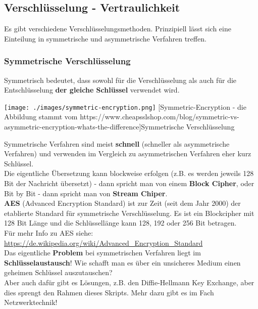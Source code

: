 \documentclass[10pt,a4paper,titlepage]{article}
\begin{document}
\subsection{Verschlüsselung - Vertraulichkeit}
Es gibt verschiedene Verschlüsselungsmethoden. Prinzipiell lässt sich eine Einteilung in symmetrische und asymmetrische Verfahren treffen.

\subsubsection{Symmetrische Verschlüsselung}
Symmetrisch bedeutet, dass sowohl für die Verschlüsselung als auch für die Entschlüsselung \textbf{der gleiche Schlüssel} verwendet wird.\\
\begin{center}
\texttt{[image: ./images/symmetric-encryption.png]}
[Symmetric-Encryption - die Abbildung stammt vom https://www.cheapsslshop.com/blog/symmetric-vs-asymmetric-encryption-whats-the-difference]{Symmetrische Verschlüsselung}
\end{center}
Symmetrische Verfahren sind meist \textbf{schnell} (schneller als asymmetrische Verfahren) und verwenden im Vergleich zu asymmetrischen Verfahren eher kurz Schlüssel.\\
Die eigentliche Übersetzung kann blockweise erfolgen (z.B. es werden jeweils 128 Bit der Nachricht übersetzt) - dann spricht man von einem \textbf{Block Cipher}, oder Bit by Bit - dann spricht man von \textbf{Stream Chiper}.\vspace{.3cm}\\
\textbf{AES} (Advanced Encryption Standard) ist zur Zeit (seit dem Jahr 2000) der etablierte Standard für symmetrische Verschlüsselung. Es ist ein Blockcipher mit 128 Bit Länge und die Schlüssellänge kann 128, 192 oder 256 Bit betragen.\\
Für mehr Info zu AES siehe:\\
\href{https://de.wikipedia.org/wiki/Advanced_Encryption_Standard}{\color{blue}https://de.wikipedia.org/wiki/Advanced\_Encryption\_Standard}\vspace{.3cm}\\
Das eigentliche \textbf{Problem} bei symmetrischen Verfahren liegt im \textbf{Schlüsselaustausch}! Wie schafft man es über ein unsicheres Medium einen geheimen Schlüssel auszutauschen?\\
Aber auch dafür gibt es Lösungen, z.B. den Diffie-Hellmann Key Exchange, aber dies sprengt den Rahmen dieses Skripts. Mehr dazu gibt es im Fach Netzwerktechnik!
\end{document}
